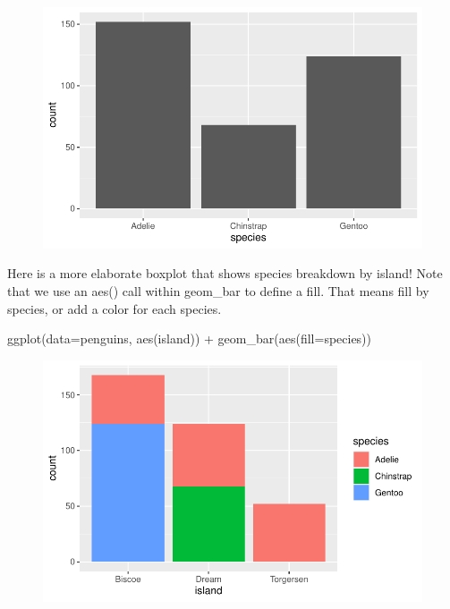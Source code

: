 \documentclass[
  letterpaper,
  DIV=11,
  numbers=noendperiod]{scrartcl}
\newenvironment{Shaded}{\begin{snugshade}}{\end{snugshade}}
\newcommand{\AttributeTok}[1]{\textcolor[rgb]{0.40,0.45,0.13}{#1}}
\newcommand{\FunctionTok}[1]{\textcolor[rgb]{0.28,0.35,0.67}{#1}}
\newcommand{\NormalTok}[1]{\textcolor[rgb]{0.00,0.23,0.31}{#1}}
\newcommand{\SpecialCharTok}[1]{\textcolor[rgb]{0.37,0.37,0.37}{#1}}
\begin{document}
\begin{figure}[H]

{\centering \includegraphics{basic_graphs_files/figure-pdf/unnamed-chunk-10-1.pdf}

}

\end{figure}

Here is a more elaborate boxplot that shows species breakdown by island!
Note that we use an aes() call within geom\_bar to define a fill. That
means fill by species, or add a color for each species.

\begin{Shaded}
\begin{Highlighting}[]
\FunctionTok{ggplot}\NormalTok{(}\AttributeTok{data=}\NormalTok{penguins, }\FunctionTok{aes}\NormalTok{(island)) }\SpecialCharTok{+}
  \FunctionTok{geom\_bar}\NormalTok{(}\FunctionTok{aes}\NormalTok{(}\AttributeTok{fill=}\NormalTok{species))}
\end{Highlighting}
\end{Shaded}

\begin{figure}[H]

{\centering \includegraphics{basic_graphs_files/figure-pdf/unnamed-chunk-11-1.pdf}

}

\end{figure}
\end{document}
